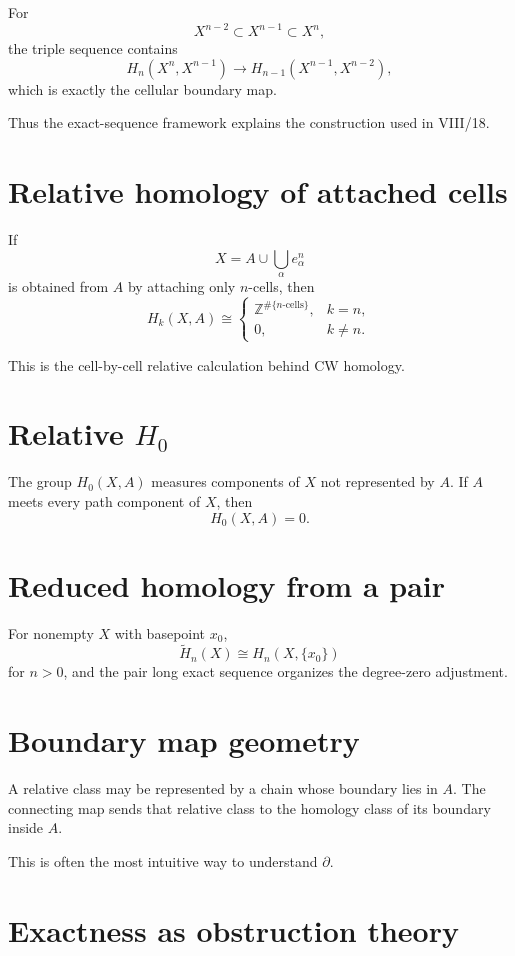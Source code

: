 For
\[
X^{n-2}\subset X^{n-1}\subset X^n,
\]
the triple sequence contains
\[
H_n(X^n,X^{n-1})
\longrightarrow
H_{n-1}(X^{n-1},X^{n-2}),
\]
which is exactly the cellular boundary map.

Thus the exact-sequence framework explains the construction used in VIII/18.

\section{Relative homology of attached cells}

If
\[
X= A\cup \bigcup_\alpha e^n_\alpha
\]
is obtained from \(A\) by attaching only \(n\)-cells, then
\[
H_k(X,A)
\cong
\begin{cases}
\mathbb Z^{\#\{\text{\(n\)-cells}\}},&k=n,\\
0,&k\ne n.
\end{cases}
\]

This is the cell-by-cell relative calculation behind CW homology.

\section{Relative \(H_0\)}

The group \(H_0(X,A)\) measures components of \(X\) not represented by \(A\).
If \(A\) meets every path component of \(X\), then
\[
H_0(X,A)=0.
\]

\section{Reduced homology from a pair}

For nonempty \(X\) with basepoint \(x_0\),
\[
\widetilde H_n(X)
\cong
H_n(X,\{x_0\})
\]
for \(n>0\), and the pair long exact sequence organizes the degree-zero
adjustment.

\section{Boundary map geometry}

A relative class may be represented by a chain whose boundary lies in \(A\).
The connecting map sends that relative class to the homology class of its
boundary inside \(A\).

This is often the most intuitive way to understand \(\partial\).

\section{Exactness as obstruction theory}


